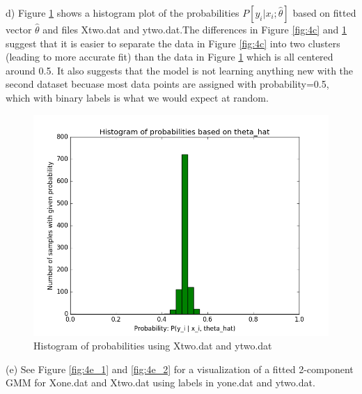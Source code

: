 \documentclass[11pt]{article}
\newenvironment{problem}[2][Problem]{\begin{trivlist}
\item[\hskip \labelsep {\bfseries #1}\hskip \labelsep {\bfseries #2.}]}{\end{trivlist}}
\begin{document}
\begin{problem}{2.4}
(d) Figure \ref{fig:4d} shows a histogram plot of the probabilities $P[y_i | x_i;\hat{\theta}]$  based on fitted vector $\hat{\theta}$ and files Xtwo.dat and ytwo.dat.The differences in Figure \ref{fig:4c} and \ref{fig:4d} suggest that it is easier to separate the data in Figure \ref{fig:4c} into two clusters (leading to more accurate fit) than the data in Figure \ref{fig:4d} which is all centered around 0.5. It also suggests that the model is not learning anything new with the second dataset becuase most data points are assigned with probability=0.5, which with binary labels is what we would expect at random. 
\begin{figure}[h!]
  \centering
  \includegraphics[scale=0.5]{figs/4d.png}
  \caption{Histogram of probabilities using Xtwo.dat and ytwo.dat}
  \label{fig:4d}
\end{figure}

(e) See Figure \ref{fig:4e_1} and \ref{fig:4e_2} for a visualization of a fitted 2-component GMM for Xone.dat and Xtwo.dat using labels in yone.dat and ytwo.dat.


\end{problem}
\end{document}
